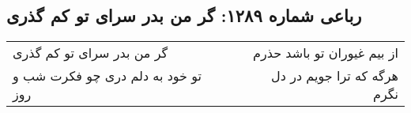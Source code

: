 \begin{center}
\section*{رباعی شماره ۱۲۸۹: گر من بدر سرای تو کم گذری}
\label{sec:1289}
\begin{longtable}{l p{0.5cm} r}
گر من بدر سرای تو کم گذری
&&
از بیم غیوران تو باشد حذرم
\\
تو خود به دلم دری چو فکرت شب و روز
&&
هرگه که ترا جویم در دل نگرم
\\
\end{longtable}
\end{center}
